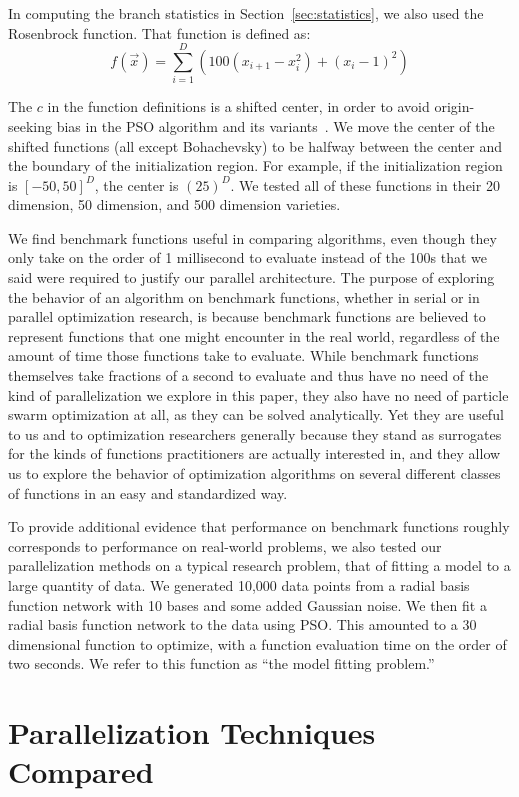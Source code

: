 \documentclass[ms,electronic,twosidetoc,letterpaper,chaptercenter,parttop,equalmargins]{byumsphd}
\renewcommand{\sec}[1]{Section~\ref{sec:#1}}
\begin{document}
In computing the branch statistics in \sec{statistics}, we also used the
Rosenbrock function.  That function is defined as:
\[f(\Vec{x}) = \sum_{i=1}^D \left(100(x_{i+1}-x_i^2)+(x_i-1)^2\right)\]

The $c$ in the function definitions is a shifted center, in order to avoid
origin-seeking bias in the PSO algorithm and its
variants~\citep{monson-2005-origin-seeking-bias}.  We move the center of the
shifted functions (all except Bohachevsky) to be halfway between the center and
the boundary of the initialization region.  For example, if the initialization
region is $[-50,50]^D$, the center is $(25)^D$.  We tested all of these
functions in their 20 dimension, 50 dimension, and 500 dimension varieties.

We find benchmark functions useful in comparing algorithms, even though they
only take on the order of 1 millisecond to evaluate instead of the 100s that we
said were required to justify our parallel architecture.  The purpose of
exploring the behavior of an algorithm on benchmark functions, whether in
serial or in parallel optimization research, is because benchmark functions are
believed to represent functions that one might encounter in the real world,
regardless of the amount of time those functions take to evaluate.  While
benchmark functions themselves take fractions of a second to evaluate and thus
have no need of the kind of parallelization we explore in this paper, they also
have no need of particle swarm optimization at all, as they can be solved
analytically.  Yet they are useful to us and to optimization researchers
generally because they stand as surrogates for the kinds of functions
practitioners are actually interested in, and they allow us to explore the
behavior of optimization algorithms on several different classes of functions
in an easy and standardized way.

To provide additional evidence that performance on benchmark functions roughly
corresponds to performance on real-world problems, we also tested our
parallelization methods on a typical research problem, that of fitting a model
to a large quantity of data.  We generated 10,000 data points from a radial
basis function network with 10 bases and some added Gaussian noise.  We then
fit a radial basis function network to the data using PSO.  This amounted to a
30 dimensional function to optimize, with a function evaluation time on the
order of two seconds.  We refer to this function as ``the model fitting
problem.''

\section{Parallelization Techniques Compared}
\end{document}
